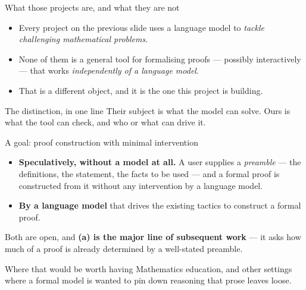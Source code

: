 \documentclass[11pt,aspectratio=169]{beamer}
\begin{document}
\begin{frame}{What those projects are, and what they are not}
  \begin{itemize}
    \item Every project on the previous slide uses a language model to
          \emph{tackle challenging mathematical problems}.
    \item None of them is a general tool for formalising proofs --- possibly
          interactively --- that works \emph{independently of a language
          model}.
    \item That is a different object, and it is the one this project is
          building.
  \end{itemize}
  \vfill
  \begin{block}{The distinction, in one line}
    Their subject is what the model can solve. Ours is what the tool can
    check, and who or what can drive it.
  \end{block}
\end{frame}

\begin{frame}{A goal: proof construction with minimal intervention}
  \begin{itemize}
    \item[(a)] \textbf{Speculatively, without a model at all.} A user supplies
          a \emph{preamble} --- the definitions, the statement, the facts to be
          used --- and a formal proof is constructed from it without any
          intervention by a language model.
    \item[(b)] \textbf{By a language model} that drives the existing tactics to
          construct a formal proof.
  \end{itemize}
  \vfill
  Both are open, and \textbf{(a) is the major line of subsequent work} --- it
  asks how much of a proof is already determined by a well-stated preamble.
  \vfill
  \begin{block}{Where that would be worth having}
    Mathematics education, and other settings where a formal model is wanted
    to pin down reasoning that prose leaves loose.
  \end{block}
\end{frame}
\end{document}
